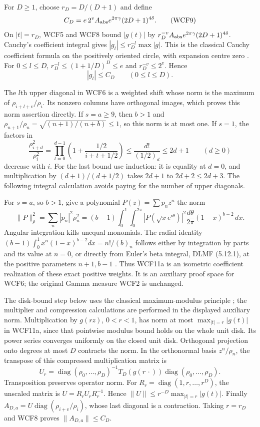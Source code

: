For $D\ge1$, choose $r_D=D/(D+1)$ and define
\[
 C_D=e\,2^v A_{\rm abs}e^{2\pi\gamma}(2D+1)^{4\delta}.
 \tag{WCF9}
\]
On $|t|=r_D$, WCF5 and WCF8 bound $|g(t)|$ by
$r_D^{-v}A_{\rm abs}e^{2\pi\gamma}(2D+1)^{4\delta}$.
Cauchy's coefficient integral gives $|g_l|\le r_D^{-l}\max|g|$.
This is the classical Cauchy coefficient formula on the positively
oriented circle, with expansion centre zero
\cite[eqs.~(1.9.30)--(1.9.31)]{human:dlmf1}.
For $0\le l\le D$, $r_D^{-l}\le(1+1/D)^D\le e$ and
$r_D^{-v}\le2^v$. Hence
\[
 |g_l|\le C_D\qquad(0\le l\le D).
 \tag{WCF10}
\]

The $l$th upper diagonal in WCF6 is a weighted shift whose norm is
the maximum of $\rho_{i+l+v}/\rho_i$. Its nonzero columns have
orthogonal images, which proves this norm assertion directly. If
$s=a\ge9$, then $b>1$ and $\rho_{n+1}/\rho_n=
\sqrt{(n+1)/(n+b)}\le1$, so this norm is at most one.
If $s=1$, the factors in
\[
 \frac{\rho_{i+d}^2}{\rho_i^2}
 =\prod_{t=0}^{d-1}\left(1+\frac{1/2}{i+t+1/2}\right)
 \le\frac{d!}{(1/2)_d}\le2d+1
 \qquad(d\ge0)
 \tag{WCF11}
\]
decrease with $i$. For the last bound use induction: it is equality
at $d=0$, and multiplication by $(d+1)/(d+1/2)$ takes $2d+1$
to $2d+2\le2d+3$. The following integral calculation avoids paying
for the number of upper diagonals.

For $s=a$, so $b>1$, give a polynomial $P(z)=\sum p_nz^n$ the norm
\[
 \|P\|_{\rho}^2=\sum_n|p_n|^2\rho_n^2
  =(b-1)\int_0^1\int_0^{2\pi}|P(\sqrt{x}e^{i\theta})|^2
       \frac{d\theta}{2\pi}(1-x)^{b-2}\,dx.
 \tag{WCF11a}
\]
Angular integration kills unequal monomials. The radial identity
$(b-1)\int_0^1x^n(1-x)^{b-2}dx=n!/(b)_n$ follows either by
integration by parts and its value at $n=0$, or directly from Euler's
beta integral, DLMF (5.12.1), at the positive parameters $n+1,b-1$
\cite{human:dlmf5}. Thus WCF11a is an isometric coefficient
realization of these exact positive weights. It is an auxiliary proof
space for WCF6; the original Gamma measure WCF2 is unchanged.

The disk-bound step below uses the classical maximum-modulus principle
\cite[\S1.10(v)]{human:dlmf1}; the multiplier and compression calculations
are performed in the displayed auxiliary norm.
Multiplication by $g(rz)$, $0<r<1$, has norm at most
$\max_{|t|=r}|g(t)|$ in WCF11a, since that pointwise modulus bound
holds on the whole unit disk. Its power series converges uniformly
on the closed unit disk. Orthogonal projection onto degrees at most
$D$ contracts the norm. In the orthonormal basis $z^n/\rho_n$, the
transpose of this compressed multiplication matrix is
\[
 U_r=\operatorname{diag}(\rho_0,\ldots,\rho_D)^{-1}
            T_D(g(r\,\cdot))\operatorname{diag}(\rho_0,\ldots,\rho_D).
 \tag{WCF11b}
\]
Transposition preserves operator norm. For
$R_r=\operatorname{diag}(1,r,\ldots,r^D)$, the unscaled matrix is
$U=R_rU_rR_r^{-1}$. Hence
$\|U\|\le r^{-D}\max_{|t|=r}|g(t)|$. Finally
$A_{D,a}=U\operatorname{diag}(\rho_{i+v}/\rho_i)$, whose last
diagonal is a contraction. Taking $r=r_D$ and WCF8 proves
$\|A_{D,a}\|\le C_D$.


